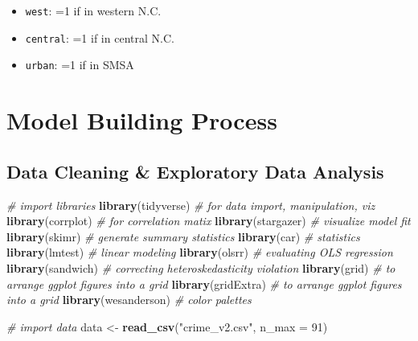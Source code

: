 \documentclass[]{article}
\newenvironment{Shaded}{\begin{snugshade}}{\end{snugshade}}
\newcommand{\CommentTok}[1]{\textcolor[rgb]{0.56,0.35,0.01}{\textit{#1}}}
\newcommand{\DataTypeTok}[1]{\textcolor[rgb]{0.13,0.29,0.53}{#1}}
\newcommand{\DecValTok}[1]{\textcolor[rgb]{0.00,0.00,0.81}{#1}}
\newcommand{\KeywordTok}[1]{\textcolor[rgb]{0.13,0.29,0.53}{\textbf{#1}}}
\newcommand{\NormalTok}[1]{#1}
\newcommand{\StringTok}[1]{\textcolor[rgb]{0.31,0.60,0.02}{#1}}
\providecommand{\tightlist}{%
  \setlength{\itemsep}{0pt}\setlength{\parskip}{0pt}}
\begin{document}
\begin{itemize}
\tightlist
\item
  \texttt{west}: =1 if in western N.C.
\item
  \texttt{central}: =1 if in central N.C.
\item
  \texttt{urban}: =1 if in SMSA
\end{itemize}

\hypertarget{model-building-process}{%
\section{Model Building Process}\label{model-building-process}}

\hypertarget{data-cleaning-exploratory-data-analysis}{%
\subsection{Data Cleaning \& Exploratory Data
Analysis}\label{data-cleaning-exploratory-data-analysis}}

\begin{Shaded}
\begin{Highlighting}[]
\CommentTok{# import libraries }
\KeywordTok{library}\NormalTok{(tidyverse) }\CommentTok{# for data import, manipulation, viz}
\KeywordTok{library}\NormalTok{(corrplot) }\CommentTok{# for correlation matix}
\KeywordTok{library}\NormalTok{(stargazer) }\CommentTok{# visualize model fit}
\KeywordTok{library}\NormalTok{(skimr) }\CommentTok{# generate summary statistics}
\KeywordTok{library}\NormalTok{(car) }\CommentTok{# statistics }
\KeywordTok{library}\NormalTok{(lmtest) }\CommentTok{# linear modeling}
\KeywordTok{library}\NormalTok{(olsrr) }\CommentTok{# evaluating OLS regression }
\KeywordTok{library}\NormalTok{(sandwich) }\CommentTok{# correcting heteroskedasticity violation}
\KeywordTok{library}\NormalTok{(grid) }\CommentTok{# to arrange ggplot figures into a grid }
\KeywordTok{library}\NormalTok{(gridExtra) }\CommentTok{# to arrange ggplot figures into a grid }
\KeywordTok{library}\NormalTok{(wesanderson) }\CommentTok{# color palettes}
\end{Highlighting}
\end{Shaded}

\begin{Shaded}
\begin{Highlighting}[]
\CommentTok{# import data}
\NormalTok{data <-}\StringTok{ }\KeywordTok{read_csv}\NormalTok{(}\StringTok{"crime_v2.csv"}\NormalTok{, }\DataTypeTok{n_max =} \DecValTok{91}\NormalTok{)}
\end{Highlighting}
\end{Shaded}
\end{document}
